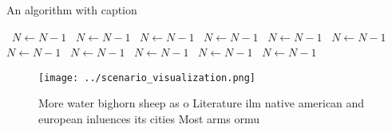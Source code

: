 \documentclass[a4paper]{article}
\begin{document}
\begin{algorithm}
\caption{An algorithm with caption}
\begin{algorithmic}
\    \State $N \gets N - 1$
\    \State $N \gets N - 1$
\    \State $N \gets N - 1$
\    \State $N \gets N - 1$
\    \State $N \gets N - 1$
\    \State $N \gets N - 1$
\    \State $N \gets N - 1$
\    \State $N \gets N - 1$
\    \State $N \gets N - 1$
\    \State $N \gets N - 1$
\    \State $N \gets N - 1$
\EndWhile
\end{algorithmic}
\end{algorithm}

\begin{figure}
\centering
\texttt{[image: ../scenario\_visualization.png]}
\caption{More water bighorn sheep as o Literature ilm native american and european inluences its cities Most arms ormu
}
\end{figure}
 
\end{document}
